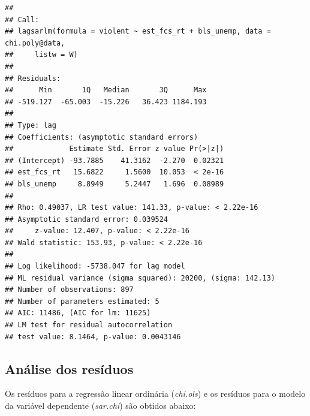 \documentclass[12pt,]{article}
\newenvironment{Shaded}{\begin{snugshade}}{\end{snugshade}}
\newcommand{\KeywordTok}[1]{\textcolor[rgb]{0.13,0.29,0.53}{\textbf{{#1}}}}
\newcommand{\StringTok}[1]{\textcolor[rgb]{0.31,0.60,0.02}{{#1}}}
\newcommand{\CommentTok}[1]{\textcolor[rgb]{0.56,0.35,0.01}{\textit{{#1}}}}
\newcommand{\NormalTok}[1]{{#1}}
\begin{document}
\begin{verbatim}
## 
## Call:
## lagsarlm(formula = violent ~ est_fcs_rt + bls_unemp, data = chi.poly@data, 
##     listw = W)
## 
## Residuals:
##      Min       1Q   Median       3Q      Max 
## -519.127  -65.003  -15.226   36.423 1184.193 
## 
## Type: lag 
## Coefficients: (asymptotic standard errors) 
##             Estimate Std. Error z value Pr(>|z|)
## (Intercept) -93.7885    41.3162  -2.270  0.02321
## est_fcs_rt   15.6822     1.5600  10.053  < 2e-16
## bls_unemp     8.8949     5.2447   1.696  0.08989
## 
## Rho: 0.49037, LR test value: 141.33, p-value: < 2.22e-16
## Asymptotic standard error: 0.039524
##     z-value: 12.407, p-value: < 2.22e-16
## Wald statistic: 153.93, p-value: < 2.22e-16
## 
## Log likelihood: -5738.047 for lag model
## ML residual variance (sigma squared): 20200, (sigma: 142.13)
## Number of observations: 897 
## Number of parameters estimated: 5 
## AIC: 11486, (AIC for lm: 11625)
## LM test for residual autocorrelation
## test value: 8.1464, p-value: 0.0043146
\end{verbatim}

\subsection{Análise dos resíduos}\label{analise-dos-residuos}

Os resíduos para a regressão linear ordinária (\emph{chi.ols}) e os
resíduos para o modelo da variável dependente (\emph{sar.chi}) são
obtidos abaixo:

\begin{Shaded}
\end{Shaded}
\end{document}

